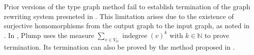 Prior versions of the type graph method \cite{bruggink2014termination,bruggink2015proving,endrullis2023generalized} fail to establish termination of the graph rewriting system presneted in . This limitation arises due to the existence of surjective homomorphisms from the output graph to the input graph, as noted in \cite{endrullis2023generalized}. In \cite{plump2018modular}, Plump uses the measure $\sum_{v\in V_G} \operatorname{indegree}(v)^k$ with $k \mathop{\in} \mathbb{N}$ to prove termination. Its termination can also be proved by the method proposed in \cite{overbeek2023termination}.

